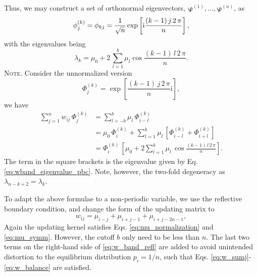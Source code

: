 \documentclass[reprint, floatfix]{revtex4-1}
\newcommand{\note}[1]{{\color{DarkGreen}\footnotesize \textsc{Note.} #1}}
\newcommand{\ii}{\mathrm{i}}
\begin{document}
Thus,
we may construct a set of orthonormal eigenvectors,
$\pmb\varphi^{(1)}, \dots, \pmb\varphi^{(n)}$,
as
\begin{equation}
  \phi^{(k)}_j
  =
  \phi_{kj}
  =
  \frac{1}{\sqrt n}
  \exp
  \left[
    \ii
    \frac{ (k - 1) \, j \, 2 \, \pi }
         {            n             }
  \right]
  ,
  \notag
\end{equation}
%
with the eigenvalues being
%
\begin{equation}
  \lambda_k
  =
  \mu_0
  +
  2 \,
  \sum_{ l = 1 }^b
  \mu_l
  \cos
  \frac{ (k - 1) \, l \, 2 \, \pi }
       {            n             }
  .
  \label{eq:wband_eigenvalue_pbc}
\end{equation}
%
\note{Consider the unnormalized version
  $$
  \Phi^{(k)}_j =
  \exp\left[
    \frac{ ( k - 1 ) \, j \, 2 \, \pi }
         {              n             }
    \ii
  \right]
  ,
  $$
  we have
  $$
  \begin{aligned}
  \sum_{j = 1}^n
    w_{ij} \, \Phi^{(k)}_j
  &=
  \sum_{l = -b}^b
    \mu_l \, \Phi^{(k)}_{i - l}
  \\
  &=
  \mu_0 \, \Phi^{(k)}_i
  +
  \sum_{l = 1}^b
    \mu_l \,
    \left[ \Phi^{(k)}_{i - l} + \Phi^{(k)}_{i + l} \right]
  \\
  &=
  \Phi^{(k)}_i \,
  \left[
    \mu_0
    +
    2 \sum_{l = 1}^b
      \mu_l \, \cos
      \frac{ (k - 1) \, l \, 2 \, \pi }
           {            n             }
  \right]
  .
  \end{aligned}
  $$
  The term in the square brackets is the eigenvalue given by
  Eq. \eqref{eq:wband_eigenvalue_pbc}.
}
%
Note, however, the two-fold degeneracy as
$\lambda_{n - k + 2} = \lambda_k$.



To adapt the above formulae to a non-periodic variable,
we use the reflective boundary condition\cite{bussi2006},
and change the form of the updating matrix to
%
%
\begin{equation}
  w_{ij}
  =
  \mu_{ i - j }
  +
  \mu_{ i + j - 1 }
  +
  \mu_{ i + j - 2 n - 1 },
  \label{eq:w_band_refl}
\end{equation}
%
Again the updating kernel satisfies
Eqs. \eqref{eq:mu_normalization}
and \eqref{eq:mu_symm}.
%
However,
the cutoff $b$ only need to be less than $n$.
%
The last two terms
on the right-hand side of \eqref{eq:w_band_refl} are added
to avoid unintended distortion\cite{dickson2011, mcgovern2013}
to the equilibrium distribution $p_i = 1/n$\cite{bussi2006},
such that Eqs. \eqref{eq:w_sumj}-\eqref{eq:w_balance}
are satisfied.
\end{document}
